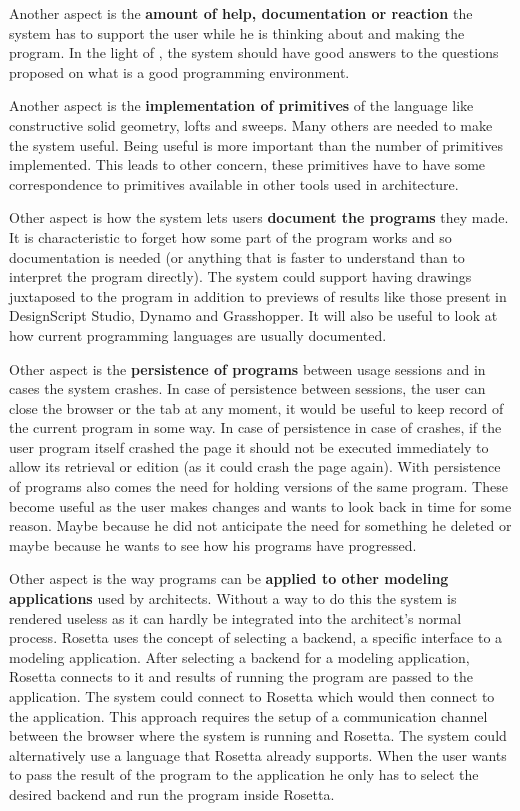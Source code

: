 \documentclass{./llncs2e/llncs}
\begin{document}
	Another aspect is the \textbf{amount of help, documentation or reaction} the system has to support the user while he is thinking about and making the program.
	In the light of \cite{victor2012learnable}, the system should have good answers to the questions proposed on what is a good programming environment.

	Another aspect is the \textbf{implementation of primitives} of the language like constructive solid geometry, lofts and sweeps. 
	Many others are needed to make the system useful. 
	Being useful is more important than the number of primitives implemented. 
	This leads to other concern, these primitives have to have some correspondence to primitives available in other tools used in architecture.

	Other aspect is how the system lets users \textbf{document the programs} they made. 
	It is characteristic to forget how some part of the program works and so documentation is needed (or anything that is faster to understand than to interpret the program directly). 
	The system could support having drawings juxtaposed to the program in addition to previews of results like those present in DesignScript Studio, Dynamo and Grasshopper. 
	It will also be useful to look at how current programming languages are usually documented. 

	Other aspect is the \textbf{persistence of programs} between usage sessions and in cases the system crashes.
	In case of persistence between sessions, the user can close the browser or the tab at any moment, it would be useful to keep record of the current program in some way. 
	In case of persistence in case of crashes, if the user program itself crashed the page it should not be executed immediately to allow its retrieval or edition (as it could crash the page again). 
	With persistence of programs also comes the need for holding versions of the same program. 
	These become useful as the user makes changes and wants to look back in time for some reason. 
	Maybe because he did not anticipate the need for something he deleted or maybe because he wants to see how his programs have progressed.

	Other aspect is the way programs can be \textbf{applied to other modeling applications} used by architects.
	Without a way to do this the system is rendered useless as it can hardly be integrated into the architect's normal process. 
	Rosetta uses the concept of selecting a backend, a specific interface to a modeling application. 
	After selecting a backend for a modeling application, Rosetta connects to it and results of running the program are passed to the application. 
	The system could connect to Rosetta which would then connect to the application. 
	This approach requires the setup of a communication channel between the browser where the system is running and Rosetta. 
	The system could alternatively use a language that Rosetta already supports. 
	When the user wants to pass the result of the program to the application he only has to select the desired backend and run the program inside Rosetta.
\end{document}
